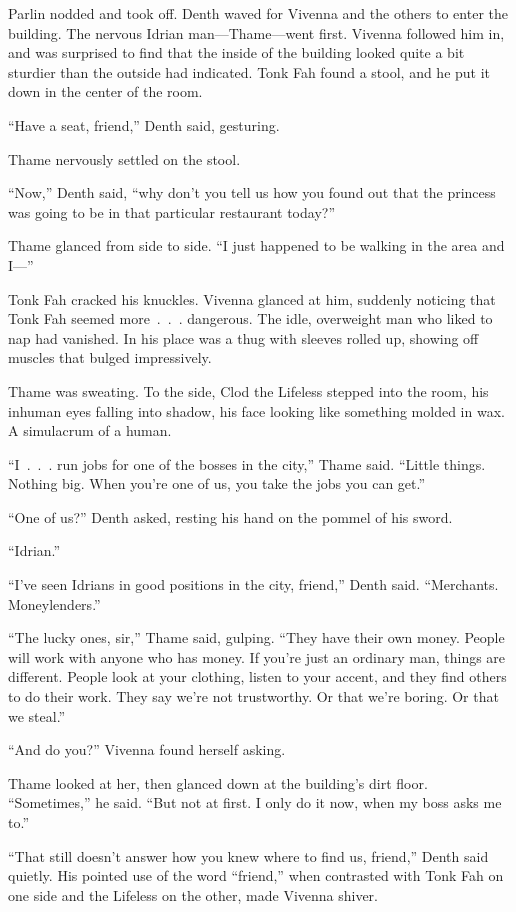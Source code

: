 Parlin nodded and took off. Denth waved for Vivenna and the others to enter the building. The nervous Idrian man—Thame—went first. Vivenna followed him in, and was surprised to find that the inside of the building looked quite a bit sturdier than the outside had indicated. Tonk Fah found a stool, and he put it down in the center of the room.

“Have a seat, friend,” Denth said, gesturing.

Thame nervously settled on the stool.

“Now,” Denth said, “why don’t you tell us how you found out that the princess was going to be in that particular restaurant today?”

Thame glanced from side to side. “I just happened to be walking in the area and I—”

Tonk Fah cracked his knuckles. Vivenna glanced at him, suddenly noticing that Tonk Fah seemed more~.~.~. dangerous. The idle, overweight man who liked to nap had vanished. In his place was a thug with sleeves rolled up, showing off muscles that bulged impressively.

Thame was sweating. To the side, Clod the Lifeless stepped into the room, his inhuman eyes falling into shadow, his face looking like something molded in wax. A simulacrum of a human.

“I~.~.~. run jobs for one of the bosses in the city,” Thame said. “Little things. Nothing big. When you’re one of us, you take the jobs you can get.”

“One of us?” Denth asked, resting his hand on the pommel of his sword.

“Idrian.”

“I’ve seen Idrians in good positions in the city, friend,” Denth said. “Merchants. Moneylenders.”

“The lucky ones, sir,” Thame said, gulping. “They have their own money. People will work with anyone who has money. If you’re just an ordinary man, things are different. People look at your clothing, listen to your accent, and they find others to do their work. They say we’re not trustworthy. Or that we’re boring. Or that we steal.”

“And do you?” Vivenna found herself asking.

Thame looked at her, then glanced down at the building’s dirt floor. “Sometimes,” he said. “But not at first. I only do it now, when my boss asks me to.”

“That still doesn’t answer how you knew where to find us, friend,” Denth said quietly. His pointed use of the word “friend,” when contrasted with Tonk Fah on one side and the Lifeless on the other, made Vivenna shiver.

